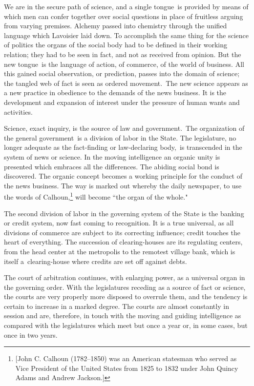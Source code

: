 \documentclass[openany,nobib]{tufte-book}
\begin{document}
We are in the secure path of science, and a single tongue~is provided by
means of which men can confer together over social questions in place of
fruitless arguing from varying premises. Alchemy passed into chemistry
through the unified language which Lavoisier laid down. To accomplish
the same thing for the science of politics the organs of the social body
had to be defined in their working relation; they had to be seen in
fact, and not as received from opinion. But the new tongue~is the
language of action, of commerce, of the world of business. All this
gained social observation, or prediction, passes into the domain of
science; the tangled web of fact is seen as ordered movement.~The new
science appears as a new practice in obedience to the demands of the
news business. It is the development and expansion of interest under the
pressure of human wants and activities.~

Science, exact inquiry, is the source of law and government.~The
organization of the general government~is a division of labor in the
State. The legislature, no longer adequate as the fact-finding or
law-declaring body,~is transcended in the system of news or science. In
the moving intelligence an organic unity is presented which embraces all
the differences. The abiding social bond is discovered. The organic
concept becomes a working principle for the conduct of the news
business. The way is marked out whereby the daily newspaper, to use the
words of Calhoun,\footnote{{[}John C. Calhoun (1782--1850) was an
  American statesman who served as Vice President of the United States
  from 1825 to 1832 under John Quincy Adams and Andrew Jackson.{]}} will
become ``the organ of the whole."~

The second division of labor in the governing system of the State is the
banking or credit system, now fast coming to recognition. It is a true
universal, as all divisions of commerce are subject to its correcting
influence; credit touches the heart of everything. The succession of
clearing-houses are its regulating centers, from the head center at the
metropolis to the remotest village bank, which is itself
a~clearing-house where credits are set off against debts.~

The court of arbitration continues, with enlarging power, as a universal
organ in the governing order. With the legislatures receding as a source
of fact or science, the courts are very properly more disposed to
overrule them, and the tendency is certain to increase in a marked
degree. The courts are almost constantly in session and are, therefore,
in touch with the moving and guiding intelligence as compared with the
legislatures which meet but once a year or, in some cases, but once in
two years.~
\end{document}
